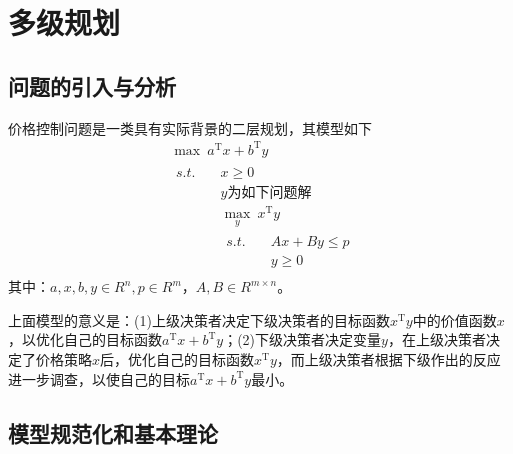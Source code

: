 % 
\chapter{多级规划}
\section{问题的引入与分析}
    \par
    价格控制问题是一类具有实际背景的二层规划，其模型如下
    \begin{align*}
        &{\max}\   a^\mathrm{T} x+b^\mathrm{T} y\\
        &
        \begin{aligned}
        s.t.\quad &x \geqslant 0\\
        & y\text{为如下问题解}\\
        & \mathop{\max}\limits_{y}\  x^\mathrm{T} y\\
        &
        \begin{aligned}
         s.t.\quad& Ax+By \leqslant p\\
        & y \geqslant 0
        \end{aligned}
        \end{aligned}
    \end{align*}
    其中：$a,x,b,y \in R^n,p \in R^m$，$A,B\in R^{m\times n}$。
    \par
    上面模型的意义是：(1)上级决策者决定下级决策者的目标函数$x^\mathrm{T} y$中的价值函数$x$，以优化自己的目标函数$a^\mathrm{T} x+b^\mathrm{T} y$；(2)下级决策者决定变量$y$，在上级决策者决定了价格策略$x$后，优化自己的目标函数$x^\mathrm{T} y$，而上级决策者根据下级作出的反应进一步调查，以使自己的目标$a^\mathrm{T} x+b^\mathrm{T} y$最小。
\section{模型规范化和基本理论}
